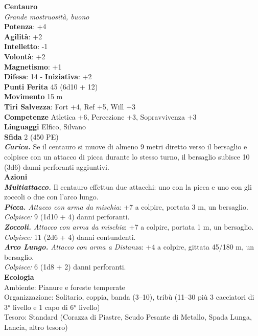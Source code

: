 \begin{multicols}{2}
\medskip\textbf{Centauro}\\
\emph{Grande mostruosità, buono}\\
\textbf{Potenza}: +4\\
\textbf{Agilità}: +2\\
\textbf{Intelletto}: -1\\
\textbf{Volontà}: +2\\
\textbf{Magnetismo}: +1\\
\textbf{Difesa}: 14 - \textbf{Iniziativa}: +2\\
\textbf{Punti Ferita} 45 (6d10 + 12)\\
\textbf{Movimento} 15 m\\
\textbf{Tiri Salvezza}: Fort +4, Ref +5, Will +3\\
\textbf{Competenze} Atletica +6, Percezione +3, Sopravvivenza +3\\
\textbf{Linguaggi} Elfico, Silvano\\
\textbf{Sfida} 2 (450 PE)\smallskip\\
\emph{\textbf{Carica.}} Se il centauro si muove di almeno 9 metri diretto verso il bersaglio e colpisce con un attacco di picca durante lo stesso turno, il bersaglio subisce 10 (3d6) danni perforanti aggiuntivi. \\
\smallskip\textbf{Azioni}\\
\emph{\textbf{Multiattacco.}} Il centauro effettua due attacchi: uno con la picca e uno con gli zoccoli o due con l'arco lungo.\\
\emph{\textbf{Picca.} Attacco con arma da mischia}: +7 a colpire, portata 3 m, un bersaglio.\\
\emph{Colpisce:} 9 (1d10 + 4) danni perforanti.\\
\emph{\textbf{Zoccoli.} Attacco con arma da mischia}: +7 a colpire, portata 1 m, un bersaglio.\\
\emph{Colpisce:} 11 (2d6 + 4) danni contundenti.\\
\emph{\textbf{Arco Lungo.} Attacco con arma a Distanza}: +4 a colpire, gittata 45/180 m, un bersaglio.\\
\emph{Colpisce:} 6 (1d8 + 2) danni perforanti.\\
\textbf{Ecologia}\\
Ambiente: Pianure e foreste temperate\\
Organizzazione: Solitario, coppia, banda (3–10), tribù (11–30 più 3 cacciatori di 3° livello e 1 capo di 6° livello)\\
Tesoro: Standard (Corazza di Piastre, Scudo Pesante di Metallo, Spada Lunga, Lancia, altro tesoro)\\

\end{multicols}
